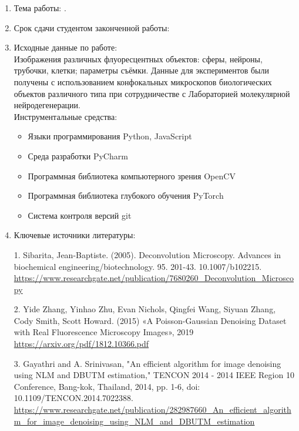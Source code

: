 \begin{enumerate}[1.]
	\item Тема работы: {\expandafter \thesisTitle.}
	\item Срок сдачи студентом законченной работы: \thesisDeadline 
	\item Исходные данные по работе:\\ Изображения различных флуоресцентных объектов: сферы, нейроны, трубочки, клетки; параметры съёмки. Данные для экспериментов были получены с использованием конфокальных микроскопов биологических объектов различного типа при сотрудничестве с Лабораторией молекулярной нейродегенерации.\\
	Инструментальные средства:
	\begin{itemize}
		\item Языки программирования Python, JavaScript 
		\item Среда разработки PyCharm
		\item Программная библиотека компьютерного зрения OpenCV
		\item Программная библиотека глубокого обучения PyTorch
		\item Система контроля версий git
	\end{itemize}
	
	\item Ключевые источники литературы:\\
	\par 1.	Sibarita, Jean-Baptiste. (2005). Deconvolution Microscopy. Advances in biochemical engineering/biotechnology. 95. 201-43. 10.1007/b102215. \url{https://www.researchgate.net/publication/7680260_Deconvolution_Microscopy}
	\par 2.	Yide Zhang, Yinhao Zhu, Evan Nichols, Qingfei Wang, Siyuan Zhang, Cody Smith, Scott Howard. (2015) «A Poisson-Gaussian Denoising Dataset with Real Fluorescence Microscopy Images», 2019 \url{https://arxiv.org/pdf/1812.10366.pdf}
	\par 3.	Gayathri and A. Srinivasan, "An efficient algorithm for image denoising using NLM and DBUTM estimation," TENCON 2014 - 2014 IEEE Region 10 Conference, Bang-kok, Thailand, 2014, pp. 1-6, doi: 10.1109/TENCON.2014.7022388. \url{https://www.researchgate.net/publication/282987660_An_efficient_algorithm_for_image_denoising_using_NLM_and_DBUTM_estimation}
	

\end{enumerate}
